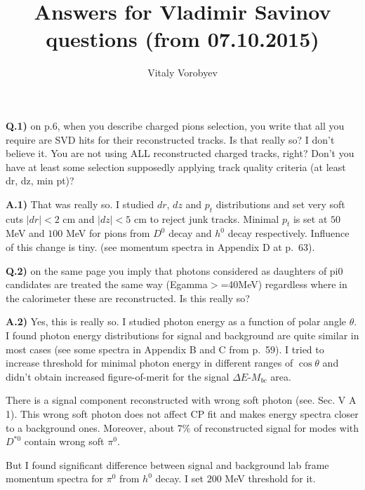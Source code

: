 \documentclass[a4paper,12pt]{article}
\title{Answers for Vladimir Savinov questions (from 07.10.2015)}
\author{Vitaly Vorobyev}
\begin{document}
\maketitle

{\bf Q.1)} on p.6, when you describe charged pions selection, you write that all you require are SVD hits for their reconstructed tracks. 
Is that really so? I don't believe it. You are not using ALL reconstructed charged tracks, right? Don't you have at least some selection supposedly applying track quality criteria (at least dr, dz, min pt)?

{\bf A.1)} That was really so. I studied $dr$, $dz$ and $p_t$ distributions and set very soft cuts $|dr|<2$ cm and $|dz|<5$ cm to reject junk tracks. Minimal $p_t$ is set at $50$ MeV and $100$ MeV for pions from $D^0$ decay and $h^0$ decay respectively. Influence of this change is tiny. (see momentum spectra in Appendix D at p.~63).

{\bf Q.2)} on the same page you imply that photons considered as daughters of pi0 candidates are treated the same way (Egamma$>$=40MeV) regardless where in the calorimeter these are reconstructed. Is this really so?

{\bf A.2)} Yes, this is really so. I studied photon energy as a function of polar angle $\theta$. I found photon energy distributions for signal and background are quite similar in most cases (see some spectra in Appendix B and C from p.~59). I tried to increase threshold for minimal photon energy in different ranges of $\cos\theta$ and didn't obtain increased figure-of-merit for the signal $\Delta E$-$M_{bc}$ area.

There is a signal component reconstructed with wrong soft photon (see. Sec. V A 1). This wrong soft photon does not affect CP fit and makes energy spectra closer to a background ones. Moreover, about $7\%$ of reconstructed signal for modes with $D^{*0}$ contain wrong soft $\pi^0$.

But I found significant difference between signal and background lab frame momentum spectra for $\pi^0$ from $h^0$ decay. I set $200$ MeV threshold for it.

\end{document}
